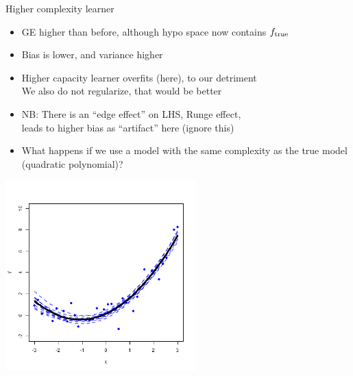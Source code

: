 \documentclass[11pt,compress,t,notes=noshow, xcolor=table]{beamer}
\begin{document}
\begin{vbframe} {Higher complexity learner}
\begin{itemize}
$$GE_n\left(\ind\right) \approx 1 + 0.139 + 1.963 \approx 3.103 $$

\vfill


\item GE higher than before, although hypo space now contains $f_{\text{true}}$
\item Bias is lower, and variance higher 
\item Higher capacity learner overfits (here), to our detriment\\
   We also do not regularize, that would be better
   
\item NB: There is an ``edge effect'' on LHS, Runge effect,\\
  leads to higher bias as ``artifact'' here (ignore this)


\framebreak

\item What happens if we use a model with the same complexity as the true model (quadratic polynomial)? 
\end{itemize}

\begin{center}
  \includegraphics[width = 0.55\textwidth]{figure/bias_variance_decomposition-correct_model.png}
\end{center}

\framebreak


\end{vbframe}
\end{document}
